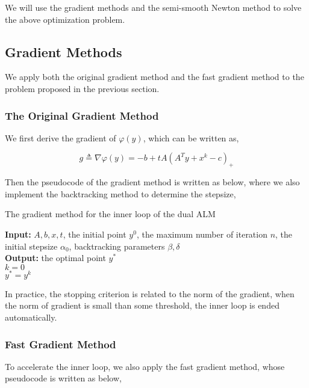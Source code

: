 \documentclass[a4paper]{article}
\begin{document}
We will use the gradient methods and the semi-smooth Newton method to solve the above optimization problem. 

\subsection{Gradient Methods}
We apply both the original gradient method and the fast gradient method to the problem proposed in the previous section. 

\subsubsection{The Original Gradient Method}
We first derive the gradient of $\varphi(y)$, which can be written as,

\begin{equation}
g \triangleq \nabla\varphi(y) = -b + t A(A^Ty+x^k-c)_+
\end{equation}

Then the pseudocode of the gradient method is written as below, where we also implement the backtracking method to determine the stepsize,  

\begin{algorithm}[htb!]
	\caption{The gradient method for the inner loop of the dual ALM}
	\SetAlgoLined
	\textbf{Input:} $A, b, x, t$, the initial point $y^0$, the maximum number of iteration $n$, the initial stepsize $\alpha_0$, backtracking parameters $\beta, \delta$\\
	\textbf{Output:} the optimal point $y^*$\\
	$k=0$\\
	$y^* = y^k$
\end{algorithm}

\pagebreak
In practice, the stopping criterion is related to the norm of the gradient, when the norm of gradient is small than some threshold, the inner loop is ended automatically. 

\subsubsection{Fast Gradient Method}
To accelerate the inner loop, we also apply the fast gradient method, whose pseudocode is written as below, 
\end{document}
